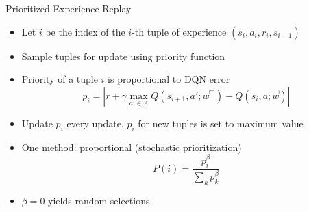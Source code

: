 \documentclass[aspectratio=169]{../latex_main/tntbeamer}  %
\begin{document}
\begin{frame}[c]{Prioritized Experience Replay }
	
	\begin{itemize}
		\item Let $i$ be the index of the $i$-th tuple of experience $(s_i,a_i,r_i,s_{i+1})$
		\item Sample tuples for update using priority function
		\item Priority of a tuple $i$ is proportional to DQN error
		$$ p_i = | r + \gamma \max_{a' \in A} Q(s_{i+1}, a'; \vec{w}^-) - Q(s_i,a;\vec{w}) |$$
		\item Update $p_i$ every update. $p_i$ for new tuples is set to maximum value
		\item One method: proportional (stochastic prioritization)
		$$ P(i) = \frac{p_i^\beta}{\sum_k p_k^\beta}$$
		\item $\beta = 0$ yields random selections 
	\end{itemize}
	
\end{frame}
\end{document}
